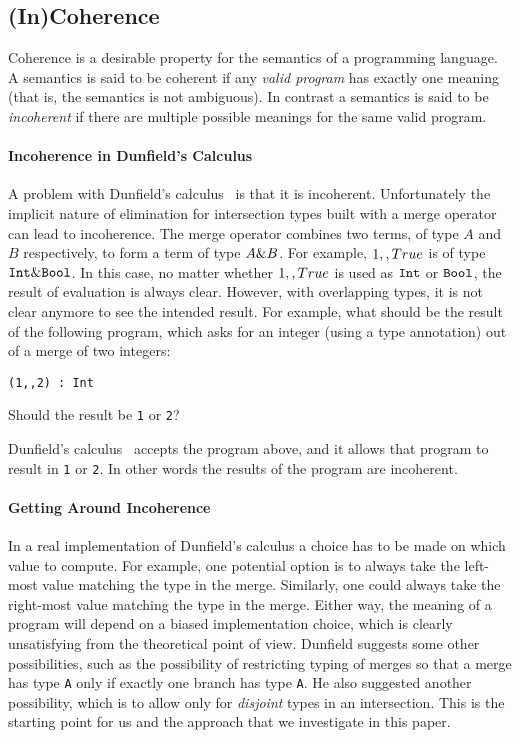 \subsection{(In)Coherence} \label{subsec:incoherence}

Coherence is a desirable property for the semantics of a programming
language. A semantics is said to be coherent if any \emph{valid
  program} has exactly one meaning~\cite{reynolds1991coherence} (that
is, the semantics is not ambiguous). In contrast a semantics is said
to be \emph{incoherent} if there are multiple possible meanings for
the same valid program. 

\paragraph{Incoherence in Dunfield's Calculus}
A problem with Dunfield's calculus~\cite{dunfield2014elaborating} is
that it is incoherent.  Unfortunately the implicit nature of
elimination for intersection types built with a merge operator can
lead to incoherence.  The merge operator combines two terms, of type
$A$ and $B$ respectively, to form a term of type $A \& B$. For
example, $1 ,, True$ is of type $\texttt{Int} \&
\texttt{Bool}$. In this case, no matter whether $1 ,, True$ is used as
$\texttt{Int}$ or $\texttt{Bool}$, the result of evaluation is always
clear. However, with overlapping types, it is not clear 
anymore to see the intended result. For example, what should be the result of
the following program, which asks for an integer (using a type annotation) out
of a merge of two integers:
\begin{lstlisting}
(1,,2) : Int
\end{lstlisting}
Should the result be \lstinline$1$ or \lstinline$2$?

Dunfield's calculus~\cite{dunfield2014elaborating} accepts the program
above, and it allows that program to result in \lstinline$1$ or \lstinline$2$.
In other words the results of the program are incoherent.

\paragraph{Getting Around Incoherence}
In a real implementation of Dunfield's calculus a choice has to be made
on which value to compute. For example, one potential option is to
always take the left-most value matching the type in the
merge. Similarly, one could always take the right-most value matching
the type in the merge. Either way, the meaning of a program will
depend on a biased implementation choice, which is clearly
unsatisfying from the theoretical point of view.  Dunfield suggests
some other possibilities, such as the possibility of restricting typing
of merges so that a merge has type \lstinline$A$ only if exactly one
branch has type \lstinline$A$. He also suggested another possibility,
which is to allow only for \emph{disjoint} types in an intersection.
This is the starting point for us and the approach that we 
investigate in this paper. 

